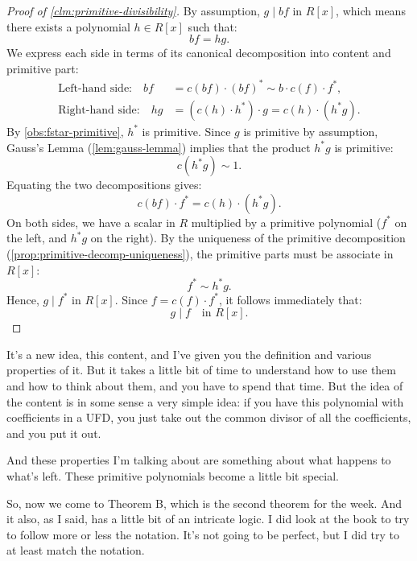 \begin{content}
\begin{proof}[Proof of \cref{clm:primitive-divisibility}]
By assumption, $g \mid bf$ in $R[x]$, which means there exists a polynomial $h \in R[x]$ such that:
\begin{equation}\label{eq:bf-hg}
bf = hg.
\end{equation}
We express each side in terms of its canonical decomposition into content and primitive part:
\begin{align*}
\text{Left-hand side:} \quad bf &= c(bf) \cdot (bf)^* \sim b \cdot c(f) \cdot f^*, \\
\text{Right-hand side:} \quad hg &= (c(h) \cdot h^*) \cdot g = c(h) \cdot (h^* g).
\end{align*}
By \cref{obs:fstar-primitive}, $h^*$ is primitive. Since $g$ is primitive by assumption, Gauss's Lemma (\cref{lem:gauss-lemma}) implies that the product $h^* g$ is primitive:
\[
c(h^* g) \sim 1.
\]
Equating the two decompositions gives:
\[
c(bf) \cdot f^* = c(h) \cdot (h^* g).
\]
On both sides, we have a scalar in $R$ multiplied by a primitive polynomial ($f^*$ on the left, and $h^* g$ on the right). By the uniqueness of the primitive decomposition (\cref{prop:primitive-decomp-uniqueness}), the primitive parts must be associate in $R[x]$:
\[
f^* \sim h^* g.
\]
Hence, $g \mid f^*$ in $R[x]$. Since $f = c(f) \cdot f^*$, it follows immediately that:
\[
g \mid f \quad \text{in } R[x].
\]
\end{proof}
\end{content}

\begin{speech}[00:19:24 - 00:20:34]
It's a new idea, this content, and I've given you the definition and various properties of it. But it takes a little bit of time to understand how to use them and how to think about them, and you have to spend that time. But the idea of the content is in some sense a very simple idea: if you have this polynomial with coefficients in a UFD, you just take out the common divisor of all the coefficients, and you put it out.

And these properties I'm talking about are something about what happens to what's left. These primitive polynomials become a little bit special.

So, now we come to Theorem B, which is the second theorem for the week. And it also, as I said, has a little bit of an intricate logic. I did look at the book to try to follow more or less the notation. It's not going to be perfect, but I did try to at least match the notation. 
\end{speech}

